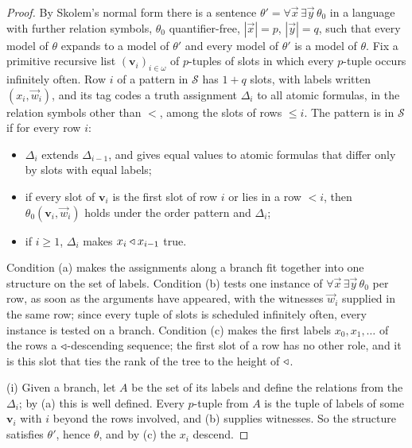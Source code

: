 \documentclass[11pt]{article}
\begin{document}
\begin{proof} By Skolem's normal form there is a sentence $\theta' = \forall \vec x\, \exists \vec y\, \theta_0$ in
a language with further relation symbols, $\theta_0$ quantifier-free, $|\vec x| = p$, $|\vec y| = q$, such that every
model of $\theta$ expands to a model of $\theta'$ and every model of $\theta'$ is a model of $\theta$. Fix a
primitive recursive list $(\mathbf v_i)_{i \in \omega}$ of $p$-tuples of slots in which every $p$-tuple occurs infinitely
often. Row $i$ of a pattern in $\mathcal S$ has $1 + q$ slots, with labels written $(x_i, \vec w_i)$, and its tag
codes a truth assignment $\Delta_i$ to all atomic formulas, in the relation symbols other than $<$, among the slots of
rows $\le i$. The pattern is in $\mathcal S$ if for every row $i$:
\begin{itemize}
\item[(a)] $\Delta_i$ extends $\Delta_{i-1}$, and gives equal values to atomic formulas that differ only by slots
  with equal labels;
\item[(b)] if every slot of $\mathbf v_i$ is the first slot of row $i$ or lies in a row $< i$, then
  $\theta_0(\mathbf v_i, \vec w_i)$ holds under the order pattern and $\Delta_i$;
\item[(c)] if $i \ge 1$, $\Delta_i$ makes $x_i \triangleleft x_{i-1}$ true.
\end{itemize}
Condition (a) makes the assignments along a branch fit together into one structure on the set of labels. Condition
(b) tests one instance of $\forall \vec x\, \exists \vec y\, \theta_0$ per row, as soon as the arguments have
appeared, with the witnesses $\vec w_i$ supplied in the same row; since every tuple of slots is scheduled
infinitely often, every instance is tested on a branch. Condition (c) makes the first labels $x_0, x_1, \dots$ of
the rows a $\triangleleft$-descending sequence; the first slot of a row has no other role, and it is this slot that ties the
rank of the tree to the height of $\triangleleft$.

(i) Given a branch, let $A$ be the set of its labels and define the relations from the $\Delta_i$; by (a) this is
well defined. Every $p$-tuple from $A$ is the tuple of labels of some $\mathbf v_i$ with $i$ beyond the rows involved,
and (b) supplies witnesses. So the structure satisfies $\theta'$, hence $\theta$, and by (c) the $x_i$ descend.


\end{proof}
\end{document}
